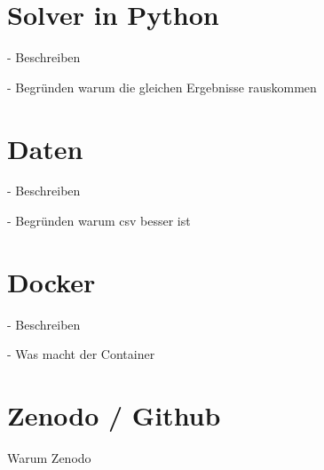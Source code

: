 \documentclass{article}
\begin{document}
\begin{multicols}{2}

\section{Solver in Python}
- Beschreiben

- Begründen warum die gleichen Ergebnisse rauskommen

\section{Daten}
- Beschreiben 

- Begründen warum csv besser ist 

\section{Docker}
- Beschreiben

- Was macht der Container

\section{Zenodo / Github}
Warum Zenodo  


\end{multicols}
\end{document}
